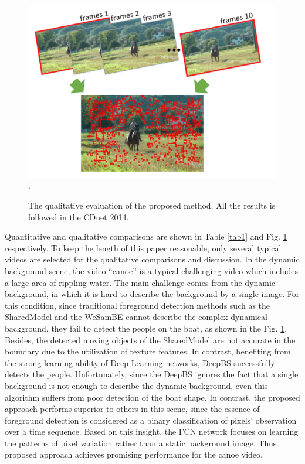 \documentclass[journal]{IEEEtran}
\newcommand{\reffig}[1]{Fig. \ref{#1}}
\newcommand{\reftab}[1]{Table \ref{#1}}
\begin{document}
\begin{figure}[!t]	\centering
    \includegraphics[width=\textwidth]{figure/fig3}
\DeclareGraphicsExtensions.
    \caption{The qualitative evaluation of the proposed method. All the results is followed in the CDnet 2014.}
    \label{results_chart}
\end{figure}

Quantitative and qualitative comparisons are shown in \reftab{tab1} and  \reffig{results_chart} respectively. 
To keep the length of this paper reasonable, only several typical videos are selected for the qualitative comparisons and discussion. 
In the dynamic background scene, the video ``canoe'' is a typical challenging video which includes a large area of rippling water. 
The main challenge comes from the dynamic background, in which it is hard to describe the background by a single image. 
For this condition, since traditional foreground detection methods such as the SharedModel and the WeSamBE cannot describe the complex dynamical background, they fail to detect the people on the boat, as shown in the \reffig{results_chart}. 
Besides, the detected moving objects of the SharedModel are not accurate in the boundary due to the utilization of texture features. 
In contrast, benefiting from the strong learning ability of Deep Learning networks, DeepBS successfully detects the people. 
Unfortunately, since the DeepBS ignores the fact that a single background is not enough to describe the dynamic background, even this algorithm suffers from poor detection of the boat shape. 
In contrast, the proposed approach performs superior to others in this scene, since the essence of foreground detection is considered as a binary classification of pixels' observation over a time sequence. 
Based on this insight, the FCN network focuses on learning the patterns of pixel variation rather than a static background image.
Thus proposed approach achieves promising performance for the canoe video.
\end{document}
